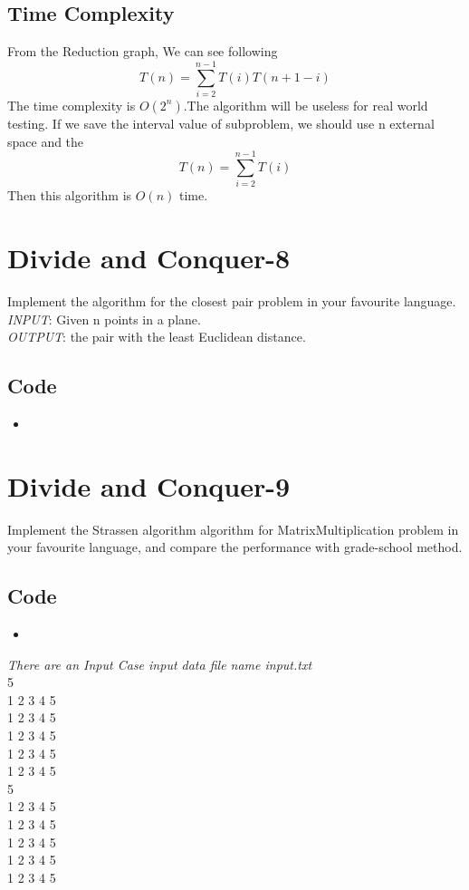 \documentclass{article}
\newcommand{\pythonscript}[2]{
\begin{itemize}
\item[]
\end{itemize}
}
\begin{document}
    \subsection{Time Complexity}
    From the Reduction graph, We can see following $$T(n) = \sum_{i=2}^{n-1}T(i)T(n+1-i)$$ The time complexity is $O(2^n)$.The algorithm will be useless for real world testing. If we save the interval value of subproblem, we should use n external space and the $$T(n) = \sum_{i=2}^{n-1}T(i)$$ Then this algorithm is $O(n)$ time.

\section{Divide and Conquer-8}
    Implement the algorithm for the closest pair problem in your favourite language.\\
    \emph{INPUT}: Given n points in a plane.\\
    \emph{OUTPUT}: the pair with the least Euclidean distance.
    \subsection{Code}
        \pythonscript{nearestpair}{algorithm for the closest pair problem in your favourite language}
\section{Divide and Conquer-9}
    Implement the Strassen algorithm algorithm for MatrixMultiplication problem in your favourite
    language, and compare the performance with grade-school method.
    \subsection{Code}
        \pythonscript{strassen}{algorithm for the closest pair problem}
        \emph{There are an Input Case input data file name input.txt} \\
        5\\
        1 2 3 4 5 \\
        1 2 3 4 5 \\
        1 2 3 4 5 \\
        1 2 3 4 5 \\
        1 2 3 4 5 \\
        5\\
        1 2 3 4 5 \\
        1 2 3 4 5 \\
        1 2 3 4 5 \\
        1 2 3 4 5 \\
        1 2 3 4 5 
\end{document}
